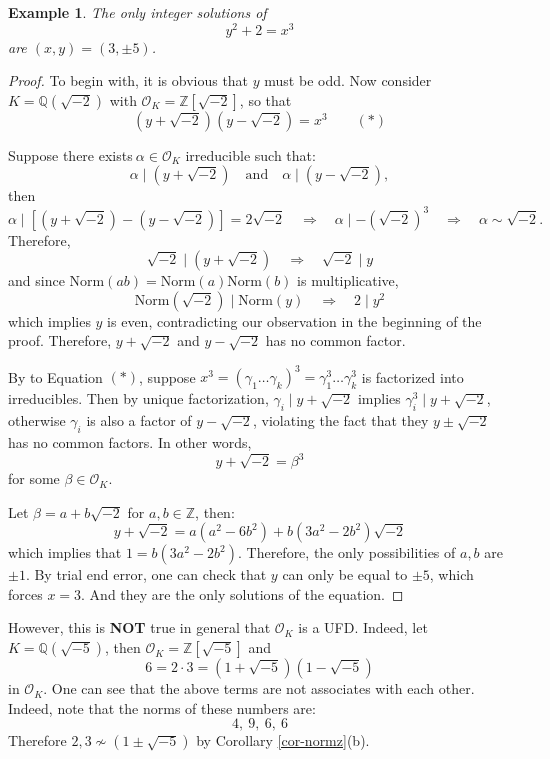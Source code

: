 \documentclass[11pt]{book}
\newtheorem{example}[theorem]{Example}
\begin{document}
\begin{example}
The only integer solutions of
\[ y^2 + 2 = x^3 \]
are $(x,y) = (3,\pm 5)$.
\end{example}

\begin{proof}
To begin with, it is obvious that \( y \) must be odd. Now consider \( K = \mathbb{Q}(\sqrt{-2}) \) with \( \mathcal{O}_K = \mathbb{Z}[\sqrt{-2}] \), so that
\[ (y + \sqrt{-2})(y - \sqrt{-2}) = x^3  \quad \quad (*)\]

Suppose there exists\( \ \alpha \in \mathcal{O}_K \) irreducible such that:
\[ \alpha \mid (y + \sqrt{-2}) \quad \text{and} \quad \alpha \mid (y - \sqrt{-2}), \]
then
\[ \alpha \mid [(y + \sqrt{-2}) - (y - \sqrt{-2})] = 2\sqrt{-2} \quad \Rightarrow \quad \alpha \mid -(\sqrt{-2})^3 \quad \Rightarrow \quad \alpha \sim \sqrt{-2}.\]
Therefore, 
$$\sqrt{-2} \mid (y + \sqrt{-2})  \quad \Rightarrow \quad  \sqrt{-2} \mid y $$
and since $\mathrm{Norm}(ab) = \mathrm{Norm}(a)\mathrm{Norm}(b)$ is multiplicative, 
$$\mathrm{Norm}(\sqrt{-2}) \mid \mathrm{Norm}(y)  \quad \Rightarrow \quad 2\mid y^2$$
which implies $y$ is even, contradicting our observation in the beginning of the proof. Therefore, \( y + \sqrt{-2} \) and \( y - \sqrt{-2} \) has no common factor.

\medskip
By to Equation $(*)$, suppose $x^3 = (\gamma_1\dots\gamma_k)^3 = \gamma_1^3\dots\gamma_k^3$ is factorized into irreducibles. Then by unique factorization, $\gamma_i \mid y + \sqrt{-2}$ implies $\gamma_i^3 \mid y + \sqrt{-2}$, otherwise $\gamma_i$ is also a factor of $y - \sqrt{-2}$, violating the fact that they $y \pm \sqrt{-2}$ has no common factors. In other words,
\[ y + \sqrt{-2} = \beta^3 \]
for some $\beta \in \mathcal{O}_K$.

Let \( \beta = a + b\sqrt{-2}\) for $a, b \in \mathbb{Z}$, then:
\[ y + \sqrt{-2} = a(a^2-6b^2) + b(3a^2-2b^2)\sqrt{-2} \]
which implies that $1 = b(3a^2-2b^2)$. Therefore, the only possibilities of $a,b$ are $\pm 1$. By trial end error, one can check that $y$ can only be equal to $\pm 5$, which forces $x = 3$. And they are the only solutions of the equation.
\end{proof}

However, this is {\bf NOT} true in general that $\mathcal{O}_K$ is a UFD. Indeed, let \( K = \mathbb{Q}(\sqrt{-5}) \), then \( \mathcal{O}_K = \mathbb{Z}[\sqrt{-5}] \) and 
\[ 6 = 2 \cdot 3 = (1 + \sqrt{-5})(1 - \sqrt{-5}) \]
in \( \mathcal{O}_K \). One can see that the above terms are not associates with each other. Indeed, note that the norms of these numbers are:
\[ 4, \ 9, \ 6, \ 6 \]
Therefore $2, 3 \nsim (1 \pm \sqrt{-5})$ by Corollary \ref{cor-normz}(b). 
\end{document}
